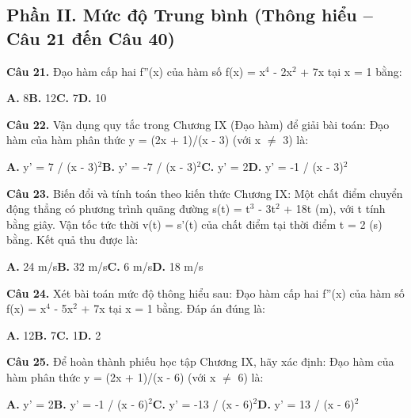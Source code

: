 \documentclass[11pt,a4paper]{article}
\begin{document}
\subsection*{\color{accent} Phần II. Mức độ Trung bình (Thông hiểu -- Câu 21 đến Câu 40)}
\textbf{\color{primary} Câu 21.} Đạo hàm cấp hai f''(x) của hàm số f(x) = x$^4$ - 2x$^2$ + 7x tại x = 1 bằng:\par
\hspace*{1.5em}\textbf{A.} 8\quad\quad \textbf{B.} 12\quad\quad \textbf{C.} 7\quad\quad \textbf{D.} 10\par\vspace{2pt}
\textbf{\color{primary} Câu 22.} Vận dụng quy tắc trong Chương IX (Đạo hàm) để giải bài toán: Đạo hàm của hàm phân thức y = (2x + 1)/(x - 3) (với x $\ne$ 3) là:\par
\hspace*{1.5em}\textbf{A.} y' = 7 / (x - 3)$^2$\quad\quad \textbf{B.} y' = -7 / (x - 3)$^2$\quad\quad \textbf{C.} y' = 2\quad\quad \textbf{D.} y' = -1 / (x - 3)$^2$\par\vspace{2pt}
\textbf{\color{primary} Câu 23.} Biến đổi và tính toán theo kiến thức Chương IX: Một chất điểm chuyển động thẳng có phương trình quãng đường s(t) = t$^3$ - 3t$^2$ + 18t (m), với t tính bằng giây. Vận tốc tức thời v(t) = s'(t) của chất điểm tại thời điểm t = 2 (s) bằng. Kết quả thu được là:\par
\hspace*{1.5em}\textbf{A.} 24 m/s\quad\quad \textbf{B.} 32 m/s\quad\quad \textbf{C.} 6 m/s\quad\quad \textbf{D.} 18 m/s\par\vspace{2pt}
\textbf{\color{primary} Câu 24.} Xét bài toán mức độ thông hiểu sau: Đạo hàm cấp hai f''(x) của hàm số f(x) = x$^4$ - 5x$^2$ + 7x tại x = 1 bằng. Đáp án đúng là:\par
\hspace*{1.5em}\textbf{A.} 12\quad\quad \textbf{B.} 7\quad\quad \textbf{C.} 1\quad\quad \textbf{D.} 2\par\vspace{2pt}
\textbf{\color{primary} Câu 25.} Để hoàn thành phiếu học tập Chương IX, hãy xác định: Đạo hàm của hàm phân thức y = (2x + 1)/(x - 6) (với x $\ne$ 6) là:\par
\hspace*{1.5em}\textbf{A.} y' = 2\quad\quad \textbf{B.} y' = -1 / (x - 6)$^2$\quad\quad \textbf{C.} y' = -13 / (x - 6)$^2$\quad\quad \textbf{D.} y' = 13 / (x - 6)$^2$\par\vspace{2pt}
\end{document}
